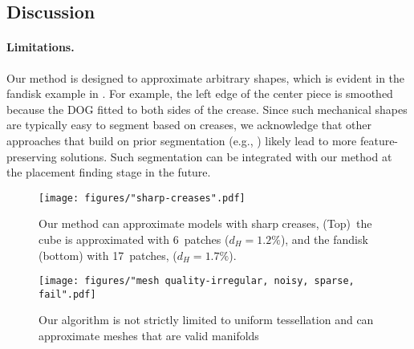 
\subsection{Discussion}  
\label{sec:discussion}


\paragraph{Limitations.}   

Our method is designed to approximate arbitrary shapes,
which is evident in the fandisk example in .
For example, the left edge of the center piece is smoothed because the DOG fitted to both sides of the crease. Since such mechanical shapes are typically easy to segment based on creases, we acknowledge that other approaches that build on prior segmentation (e.g., \cite{mitani2004making}) likely lead to more feature-preserving solutions. Such segmentation can be integrated with our method at the placement finding stage in the future. 

\begin{figure} [b]
    \centering
    \noindent\texttt{[image: figures/"sharp-creases".pdf]}
    \caption{
        Our method can approximate models with sharp creases, 
        (Top)~the cube is approximated with 6~patches ($d_H = 1.2\%$), %
        and the fandisk (bottom) with 17~patches, ($d_H = 1.7\% $).%
        \label{fig:mechanical_cube-fandisk}}
\end{figure}

\begin{figure} 
\centering
\noindent\texttt{[image: figures/"mesh quality-irregular, noisy, sparse, fail".pdf]}
\caption{
    Our algorithm is not strictly limited to uniform tessellation and can approximate meshes that are valid manifolds 
    \label{fig:mesh_robustness}}
    \vspace{-10pt}
\end{figure}

